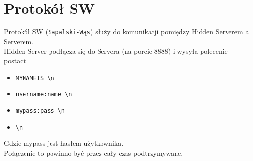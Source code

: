 \documentclass[a4paper,notitlepage]{article}
\begin{document}
\pagestyle{fancy}
\tableofcontents
\section{Protokół SW}
Protokół SW (\texttt{Sapalski-Wąs}) służy do komunikacji pomiędzy Hidden Serverem a Serverem. \\
Hidden Server podłącza się do Servera (na porcie 8888) i wysyła polecenie postaci:
\begin{itemize}
    \item \texttt{MYNAMEIS \textbackslash n}
    \item \texttt{username:name \textbackslash n}
    \item \texttt{mypass:pass \textbackslash n}
    \item \texttt{\textbackslash n}
\end{itemize}
Gdzie mypass jest hasłem użytkownika.\\
Połączenie to powinno być przez cały czas podtrzymywane.\\
\end{document}
